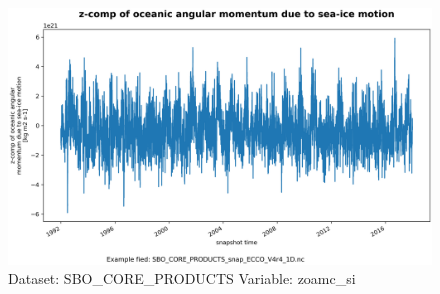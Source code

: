 \begin{figure}[H]
\centering
\includegraphics[width=\textwidth]{../images/plots/oneD_plots/SBO_Core_Products/zoamc_si.png}
\caption{Dataset: SBO\_CORE\_PRODUCTS Variable: zoamc\_si}
\label{tab:table-SBO_CORE_PRODUCTS_zoamc_si-Plot}
\end{figure}
\pagebreak
